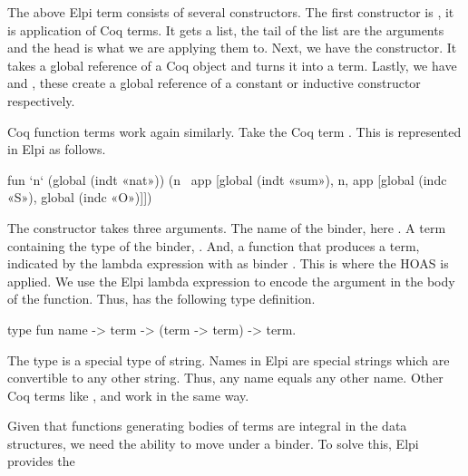 \documentclass[thesis.tex]{subfiles}
\begin{document}
{{The above Elpi term consists of several constructors. The first constructor is , it is application of Coq terms. It gets a list, the tail of the list are the arguments and the head is what we are applying them to. Next, we have the  constructor. It takes a global reference of a Coq object and turns it into a term. Lastly, we have  and , these create a global reference of a constant or inductive constructor respectively.

Coq function terms work again similarly. Take the Coq term . This is represented in Elpi as follows.
\begin{elpicode}
  fun `n` (global (indt «nat»)) 
            (n \ app [global (indt «sum»), 
                      n, app [global (indc «S»), 
                              global (indc «O»)]])
\end{elpicode}
The  constructor takes three arguments. The name of the binder, here . A term containing the type of the binder, . And, a function that produces a term, indicated by the lambda expression with as binder . This is where the HOAS is applied. We use the Elpi lambda expression to encode the argument in the body of the function. Thus,  has the following type definition.
\begin{elpicode}
  type fun name -> term -> (term -> term) -> term.
\end{elpicode}
The type  is a special type of string. Names in Elpi are special strings which are convertible to any other string. Thus, any name equals any other name. Other Coq terms like ,  and  work in the same way.

Given that functions generating bodies of terms are integral in the \ce data structures, we need the ability to move under a binder. To solve this, Elpi provides the }}
\end{document}
